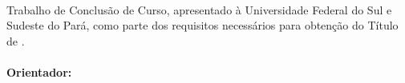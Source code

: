 %
%

\makeatletter
\begin{folhaderosto}
	\thispagestyle{empty} %
	\setlength{\baselineskip}{1.2\baselineskip}
	\begin{center}
		
		\textbf{\expandafter\expandafter{\imprimirnomeautor}}\\
		\vspace*{5.1cm} %
		\textbf{\expandafter\uppercase\expandafter{\imprimirtitulotb}}\\
		\abntex@ifnotempty{\imprimirsubtitulo} {%
			\textbf{\expandafter\expandafter{\imprimirsubtitulo}}\\
		}
		
	\end{center}
	
	\vspace*{4.38cm} %
	\hfill %
	\begin{minipage}{8cm} %
		\begin{normalsize} %
			\setlength{\baselineskip}{0.78\baselineskip}
			
			{Trabalho de Conclusão de Curso, apresentado à Universidade Federal do Sul e Sudeste do Pará, como parte dos requisitos necessários para obtenção do Título de \imprimirgrau.}\\{
			}\\\textbf{Orientador:}\\{\imprimirtitulacaoorientador }{ }{\imprimirorientador}\\{
			}
			
		\end{normalsize} %
	\end{minipage} %
	
	\vspace*{5.9cm} %
	
	\begin{center} %
		\normalsize %
		\textbf{\imprimirlocal}\\
		\textbf{\imprimirdata}
	\end{center}%
	
\end{folhaderosto}
\makeatother